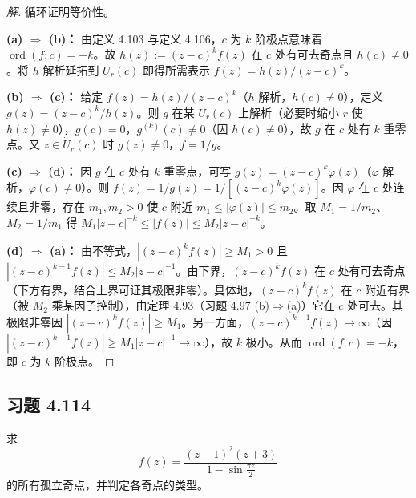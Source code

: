 \documentclass[11pt,a4paper]{article}
\theoremstyle{definition}
\newenvironment{solution}{\begin{proof}[解]}{\end{proof}}
\begin{document}
\begin{solution}
  循环证明等价性。

  \medskip
  \noindent\textbf{(a) $\Rightarrow$ (b)：}
  由定义 4.103 与定义 4.106，$c$ 为 $k$ 阶极点意味着 $\operatorname{ord}(f; c) = -k$。故 $h(z) := (z-c)^k f(z)$ 在 $c$ 处有可去奇点且 $h(c) \ne 0$。将 $h$ 解析延拓到 $U_r(c)$ 即得所需表示 $f(z) = h(z)/(z-c)^k$。

  \medskip
  \noindent\textbf{(b) $\Rightarrow$ (c)：}
  给定 $f(z) = h(z)/(z-c)^k$（$h$ 解析，$h(c) \ne 0$），定义 $g(z) = (z-c)^k/h(z)$。则 $g$ 在某 $U_r(c)$ 上解析（必要时缩小 $r$ 使 $h(z) \ne 0$），$g(c) = 0$，$g^{(k)}(c) \ne 0$（因 $h(c) \ne 0$），故 $g$ 在 $c$ 处有 $k$ 重零点。又 $z \in \dot{U}_r(c)$ 时 $g(z) \ne 0$，$f = 1/g$。

  \medskip
  \noindent\textbf{(c) $\Rightarrow$ (d)：}
  因 $g$ 在 $c$ 处有 $k$ 重零点，可写 $g(z) = (z-c)^k \varphi(z)$（$\varphi$ 解析，$\varphi(c) \ne 0$）。则 $f(z) = 1/g(z) = 1/[(z-c)^k \varphi(z)]$。因 $\varphi$ 在 $c$ 处连续且非零，存在 $m_1, m_2 > 0$ 使 $c$ 附近 $m_1 \le |\varphi(z)| \le m_2$。取 $M_1 = 1/m_2$、$M_2 = 1/m_1$ 得 $M_1 |z-c|^{-k} \le |f(z)| \le M_2 |z-c|^{-k}$。

  \medskip
  \noindent\textbf{(d) $\Rightarrow$ (a)：}
  由不等式，$|(z-c)^k f(z)| \ge M_1 > 0$ 且 $|(z-c)^{k-1} f(z)| \le M_2 |z-c|^{-1}$。由下界，$(z-c)^k f(z)$ 在 $c$ 处有可去奇点（下方有界，结合上界可证其极限非零）。具体地，$(z-c)^k f(z)$ 在 $c$ 附近有界（被 $M_2$ 乘某因子控制），由定理 4.93（习题 4.97 (b)$\Rightarrow$(a)）它在 $c$ 处可去。其极限非零因 $|(z-c)^k f(z)| \ge M_1$。另一方面，$(z-c)^{k-1} f(z) \to \infty$（因 $|(z-c)^{k-1} f(z)| \ge M_1 |z-c|^{-1} \to \infty$），故 $k$ 极小。从而 $\operatorname{ord}(f; c) = -k$，即 $c$ 为 $k$ 阶极点。
\end{solution}

\subsection{习题 4.114}

求
\[
  f(z) = \frac{(z-1)^2(z+3)}{1 - \sin\frac{\pi z}{2}}
\]
的所有孤立奇点，并判定各奇点的类型。
\end{document}
